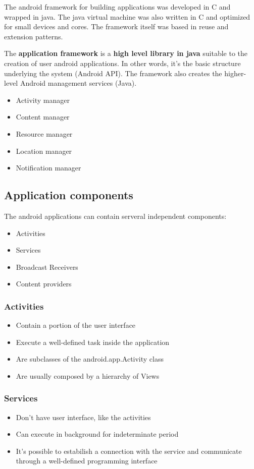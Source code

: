 The android framework for building applications was developed in C and wrapped in java. 
The java virtual machine was also written in C and optimized for small devices and cores. 
The framework itself was based in reuse and extension patterns.   

The \textbf{application framework} is a \textbf{high level library in java} suitable to the creation
of user android applications. In other words, it's the basic structure underlying the system (Android API).  
The framework also creates the higher-level Android management services (Java).  

\begin{itemize}
    \item Activity manager
    \item Content manager 
    \item Resource manager 
    \item Location manager 
    \item Notification manager
\end{itemize}

\subsection{Application components}
The android applications can contain serveral independent components:  
\begin{itemize}
    \item Activities 
    \item Services 
    \item Broadcast Receivers 
    \item Content providers 
\end{itemize}

\subsubsection{Activities}
\begin{itemize}
    \item Contain a portion of the user interface
    \item Execute a well-defined task inside the application 
    \item Are subclasses of the android.app.Activity class
    \item Are usually composed by a hierarchy of Views
\end{itemize}

\subsubsection{Services}
\begin{itemize}
    \item Don't have user interface, like the activities
    \item Can execute in background for indeterminate period
    \item It's possible to estabilish a connection with the service and communicate through a
    well-defined programming interface
\end{itemize}

